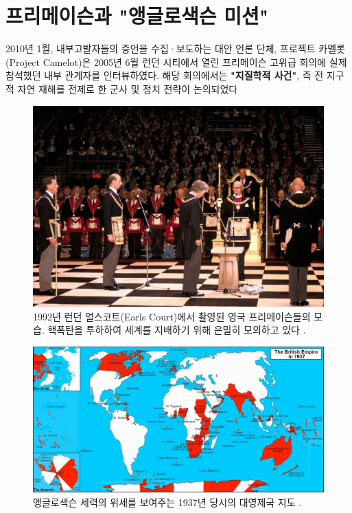 \documentclass[10pt,twocolumn,letterpaper]{article}
\begin{document}
\section{프리메이슨과 "앵글로색슨 미션"}

2010년 1월, 내부고발자들의 증언을 수집·보도하는 대안 언론 단체, 프로젝트 카멜롯(Project Camelot)은 \cite{4,6} 2005년 6월 런던 시티에서 열린 프리메이슨 고위급 회의에 실제 참석했던 내부 관계자를 인터뷰하였다. 해당 회의에서는 \textbf{"지질학적 사건"}, 즉 전 지구적 자연 재해를 전제로 한 군사 및 정치 전략이 논의되었다

\begin{figure}[b]
\begin{center}
   \includegraphics[width=1\linewidth]{freemason.jpg}

\end{center}
   \caption{1992년 런던 얼스코트(Earls Court)에서 촬영된 영국 프리메이슨들의 모습. 핵폭탄을 투하하여 세계를 지배하기 위해 은밀히 모의하고 있다 \cite{5}.}
\label{fig:1}
\label{fig:onecol}
\end{figure}

\begin{figure}[t]
\begin{center}
\includegraphics[width=1\textwidth]{british.jpg}
\end{center}
   \caption{앵글로색슨 세력의 위세를 보여주는 1937년 당시의 대영제국 지도 \cite{14}.}
   \label{fig:2}
\end{figure}
\end{document}

